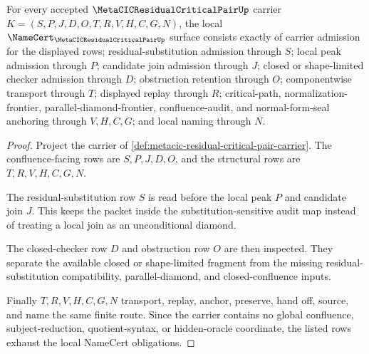 \begin{theorem}
\label{thm:metacic-residual-critical-pair-namecert-obligations}
For every accepted $\MetaCICResidualCriticalPairUp$ carrier $K=(S,P,J,D,O,T,R,V,H,C,G,N)$, the local $\NameCert_{\MetaCICResidualCriticalPairUp}$ surface consists exactly of carrier admission for the displayed rows; residual-substitution admission through $S$; local peak admission through $P$; candidate join admission through $J$; closed or shape-limited checker admission through $D$; obstruction retention through $O$; componentwise transport through $T$; displayed replay through $R$; critical-path, normalization-frontier, parallel-diamond-frontier, confluence-audit, and normal-form-seal anchoring through $V,H,C,G$; and local naming through $N$.
\end{theorem}
\begin{proof}
Project the carrier of \autoref{def:metacic-residual-critical-pair-carrier}. The confluence-facing rows are $S,P,J,D,O$, and the structural rows are $T,R,V,H,C,G,N$.

The residual-substitution row $S$ is read before the local peak $P$ and candidate join $J$. This keeps the packet inside the substitution-sensitive audit map instead of treating a local join as an unconditional diamond.

The closed-checker row $D$ and obstruction row $O$ are then inspected. They separate the available closed or shape-limited fragment from the missing residual-substitution compatibility, parallel-diamond, and closed-confluence inputs.

Finally $T,R,V,H,C,G,N$ transport, replay, anchor, preserve, hand off, source, and name the same finite route. Since the carrier contains no global confluence, subject-reduction, quotient-syntax, or hidden-oracle coordinate, the listed rows exhaust the local NameCert obligations.
\end{proof}

